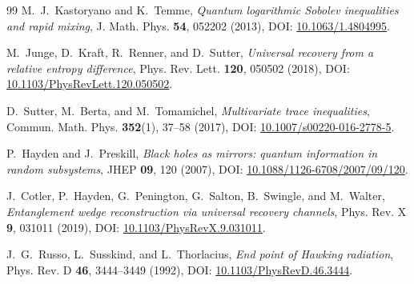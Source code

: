 \documentclass[11pt,a4paper]{article}
\theoremstyle{plain}
\theoremstyle{definition}
\begin{document}
\begin{thebibliography}{99}
M.~J.~Kastoryano and K.~Temme, \textit{Quantum logarithmic Sobolev inequalities and rapid mixing}, J. Math. Phys. \textbf{54}, 052202 (2013), DOI: \href{https://doi.org/10.1063/1.4804995}{10.1063/1.4804995}.

M.~Junge, D.~Kraft, R.~Renner, and D.~Sutter, \textit{Universal recovery from a relative entropy difference}, Phys. Rev. Lett. \textbf{120}, 050502 (2018), DOI: \href{https://doi.org/10.1103/PhysRevLett.120.050502}{10.1103/PhysRevLett.120.050502}.

D.~Sutter, M.~Berta, and M.~Tomamichel, \textit{Multivariate trace inequalities}, Commun. Math. Phys. \textbf{352}(1), 37--58 (2017), DOI: \href{https://doi.org/10.1007/s00220-016-2778-5}{10.1007/s00220-016-2778-5}.

P.~Hayden and J.~Preskill, \textit{Black holes as mirrors: quantum information in random subsystems}, JHEP \textbf{09}, 120 (2007), DOI: \href{https://doi.org/10.1088/1126-6708/2007/09/120}{10.1088/1126-6708/2007/09/120}.

J.~Cotler, P.~Hayden, G.~Penington, G.~Salton, B.~Swingle, and M.~Walter, \textit{Entanglement wedge reconstruction via universal recovery channels}, Phys. Rev. X \textbf{9}, 031011 (2019), DOI: \href{https://doi.org/10.1103/PhysRevX.9.031011}{10.1103/PhysRevX.9.031011}.

J.~G.~Russo, L.~Susskind, and L.~Thorlacius, \textit{End point of Hawking radiation}, Phys. Rev. D \textbf{46}, 3444--3449 (1992), DOI: \href{https://doi.org/10.1103/PhysRevD.46.3444}{10.1103/PhysRevD.46.3444}.
\end{thebibliography}
\end{document}
